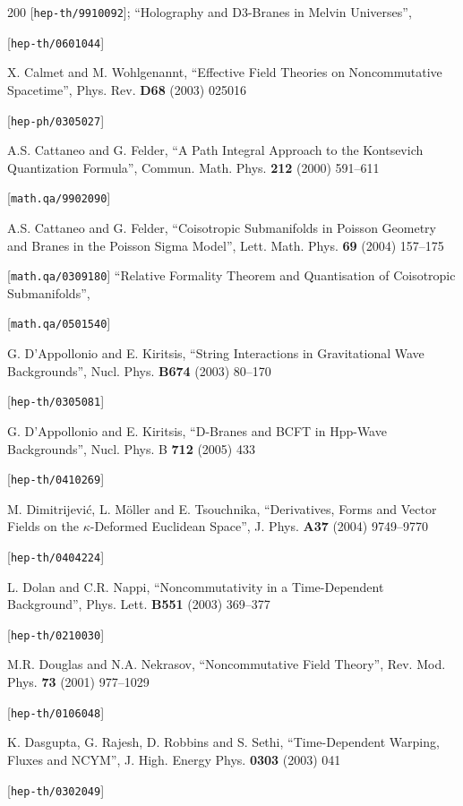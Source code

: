 \begin{thebibliography}{200}
 [{\tt hep-th/9910092}]; ``Holography and D3-Branes in Melvin Universes'', 

 [{\tt hep-th/0601044}] 

 X. Calmet and M. Wohlgenannt, ``Effective Field Theories on Noncommutative Spacetime'', Phys. Rev. {\bf D68} (2003) 025016 

 [{\tt hep-ph/0305027}] 

 A.S. Cattaneo and G. Felder, ``A Path Integral Approach to the Kontsevich Quantization Formula'', Commun. Math. Phys. {\bf 212} (2000) 591--611 

 [{\tt math.qa/9902090}] 

 A.S. Cattaneo and G. Felder, ``Coisotropic Submanifolds in Poisson Geometry and Branes in the Poisson Sigma Model'', Lett. Math. Phys. {\bf 69} (2004) 157--175 

 [{\tt math.qa/0309180}] ``Relative Formality Theorem and Quantisation of Coisotropic Submanifolds'', 

 [{\tt math.qa/0501540}] 

 G. D'Appollonio and E. Kiritsis, ``String Interactions in Gravitational Wave Backgrounds'', Nucl. Phys. {\bf B674} (2003) 80--170 

 [{\tt hep-th/0305081}] 

 G. D'Appollonio and E. Kiritsis, ``D-Branes and BCFT in Hpp-Wave Backgrounds'', Nucl. Phys. B {\bf 712} (2005) 433 

 [{\tt hep-th/0410269}] 

 M. Dimitrijevi\'c, L. M\"oller and E. Tsouchnika, ``Derivatives, Forms and Vector Fields on the $\kappa$-Deformed Euclidean Space'', J. Phys. {\bf A37} (2004) 9749--9770 

 [{\tt hep-th/0404224}] 

 L. Dolan and C.R. Nappi, ``Noncommutativity in a Time-Dependent Background'', Phys. Lett. {\bf B551} (2003) 369--377 

 [{\tt hep-th/0210030}] 

 M.R. Douglas and N.A. Nekrasov, ``Noncommutative Field Theory'', Rev. Mod. Phys. {\bf 73} (2001) 977--1029 

 [{\tt hep-th/0106048}] 

 K. Dasgupta, G. Rajesh, D. Robbins and S. Sethi, ``Time-Dependent Warping, Fluxes and NCYM'', J. High. Energy Phys. {\bf 0303} (2003) 041 

 [{\tt hep-th/0302049}] 


\end{thebibliography}
